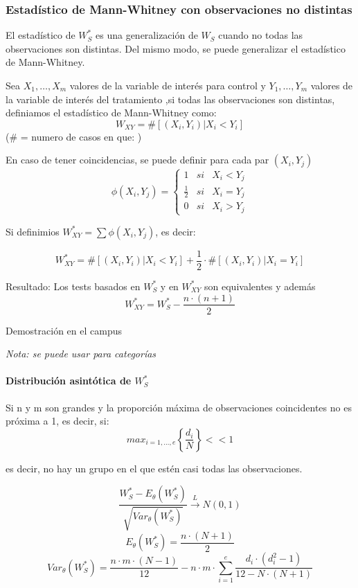 \subsubsection{Estadístico de Mann-Whitney con observaciones no distintas}

El estadístico de $W_S^*$ es una generalización de $W_S$ cuando no todas las observaciones son distintas.
Del mismo modo, se puede generalizar el estadístico de Mann-Whitney. 

Sea $X_1,\dots,X_m$ valores de la variable de interés para control y $Y_1,\dots,Y_m$ valores de la variable de interés del tratamiento
,si todas las observaciones son distintas, definiamos el estadístico de Mann-Whitney como:
\[
    W_{XY}= \# [(X_i,Y_i)|X_i<Y_i]
\]
($\#$ = numero de casos en que: )

En caso de tener coincidencias, se puede definir para cada par $(X_i,Y_j)$
\[
    \phi(X_i,Y_j)=\left\{ 
        \begin{matrix}
            1 & si & X_i<Y_j \\
            \frac{1}{2} & si & X_i=Y_j \\
            0 & si & X_i>Y_j
        \end{matrix}
    \right.
\]

Si definimios $W_{XY}^*=\sum \phi (X_i,Y_j)$, es decir:

\[
    W_{XY}^* = \# [(X_i,Y_i)|X_i<Y_i] + \frac{1}{2} \cdot \# [(X_i,Y_i)|X_i=Y_i]
\]

Resultado: Los tests basados en $W_S^*$ y en $W_{XY}^*$ son equivalentes y además
\[
    W_{XY}^*=W_S^*-\frac{n \cdot (n+1)}{2}
\]

Demostración en el campus

\textit{Nota: se puede usar para categorías}

\paragraph{Distribución asintótica de $W_S^*$}

Si n y m son grandes y la proporción máxima de observaciones coincidentes no es próxima a 1, es decir, si:
\[
    max_{i=1,\dots,e}\left\{\frac{d_i}{N} \right\} << 1
\]

es decir, no hay un grupo en el que estén casi todas las observaciones.

\[
    \frac{W_S^*-E_\theta(W_S^*)}{\sqrt{Var_\theta(W_S^*)}} \xrightarrow{L} N(0,1)
\]
\[
    E_\theta(W_S^*)=\frac{n \cdot (N+1)}{2}
\]
\[
    Var_\theta(W_S^*)= \frac{n \cdot m \cdot (N-1)}{12}-n\cdot m \cdot \sum_{i=1}^{e} \frac{d_i \cdot (d_i^2-1)}{12-N \cdot (N+1)}
\]

